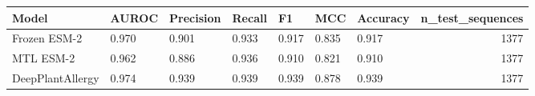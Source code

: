 \begin{tabular}{lllllllr}
\toprule
Model & AUROC & Precision & Recall & F1 & MCC & Accuracy & n_test_sequences \\
\midrule
Frozen ESM-2 & 0.970 & 0.901 & 0.933 & 0.917 & 0.835 & 0.917 & 1377 \\
MTL ESM-2 & 0.962 & 0.886 & 0.936 & 0.910 & 0.821 & 0.910 & 1377 \\
DeepPlantAllergy & 0.974 & 0.939 & 0.939 & 0.939 & 0.878 & 0.939 & 1377 \\
\bottomrule
\end{tabular}
